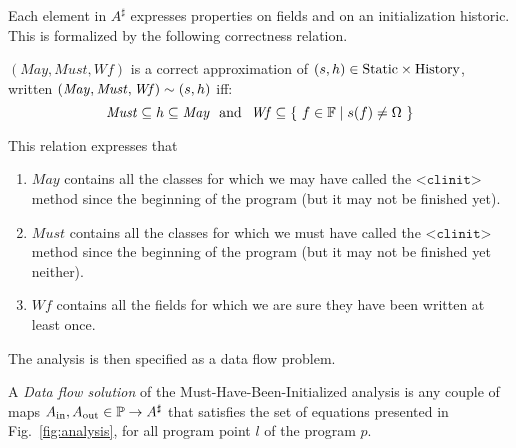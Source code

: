 \documentclass{entcs}
\newcommand{\clinit}{\ensuremath{\texttt{<clinit>}}}
\newcommand{\may}{\ensuremath{\mathit{May}}}
\newcommand{\must}{\ensuremath{\mathit{Must}}}
\newcommand{\wf}{\ensuremath{\mathit{Wf}}}
\begin{document}
Each element in $A^\sharp$ expresses properties on fields and on an
initialization historic.  This is formalized by the following
correctness relation.
\begin{definition}
  $(\may,\must,\wf)$ is a correct approximation of
  $(s,h)\in\mathrm{Static}\times\mathrm{History}$, written
  $(\may,\must,\wf)\sim(s,\hist)$ iff:
 $$ \must \subseteq \hist \subseteq \may ~~\mathrm{and}~~\wf \subseteq \{\ f\in\fields \mid s(f)\not=\undef\ \}$$
\end{definition}
This relation expresses that
\begin{enumerate}
\item $\may$ contains all the classes for which we may have called the
  \clinit{} method since the beginning of the program (but it may not
  be finished yet).
\item $\must$ contains all the classes for which we must have called
  the \clinit{} method since the beginning of the program (but it may
  not be finished yet neither).
\item $\wf$ contains all the fields for which we are sure they have
  been written at least once.
\end{enumerate}

The analysis is then specified as a data flow problem.
\begin{definition}
  A \emph{Data flow solution} of the Must-Have-Been-Initialized
  analysis is any couple of maps $A_{\mathrm{in}},A_{\mathrm{out}}\in\mathbb{P}\to A^\sharp$
  that satisfies the set of equations presented in
  Fig.~\ref{fig:analysis}, for all program point $l$ of the program
  $p$.
\end{definition}
\end{document}

